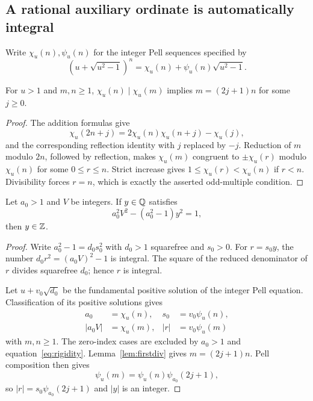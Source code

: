\subsection{A rational auxiliary ordinate is automatically integral}

Write $\chi_u(n),\psi_u(n)$ for the integer Pell sequences specified by
\[
(u+\sqrt{u^2-1})^n=\chi_u(n)+\psi_u(n)\sqrt{u^2-1}.
\]

\begin{lemma}
\label{lem:firstdiv}
For $u>1$ and $m,n\ge1$,
$\chi_u(n)\mid\chi_u(m)$ implies $m=(2j+1)n$ for some $j\ge0$.
\end{lemma}
\begin{proof}
The addition formulas give
\[
\chi_u(2n+j)=2\chi_u(n)\chi_u(n+j)-\chi_u(j),
\]
and the corresponding reflection identity with $j$ replaced by $-j$.
Reduction of $m$ modulo $2n$, followed by reflection, makes
$\chi_u(m)$ congruent to $\pm\chi_u(r)$ modulo $\chi_u(n)$ for some
$0\le r\le n$.  Strict increase gives
$1\le\chi_u(r)<\chi_u(n)$ if $r<n$.  Divisibility forces $r=n$,
which is exactly the asserted odd-multiple condition.
\end{proof}

\begin{lemma}
\label{lem:rigidity}
Let $a_0>1$ and $V$ be integers.  If $y\in\mathbb Q$ satisfies
\begin{equation}
a_0^2V^2-(a_0^2-1)y^2=1,
\label{eq:rigidity}
\end{equation}
then $y\in\mathbb Z$.
\end{lemma}
\begin{proof}
Write $a_0^2-1=d_0s_0^2$ with $d_0>1$ squarefree and $s_0>0$.
For $r=s_0y$, the number $d_0r^2=(a_0V)^2-1$ is integral.
The square of the reduced denominator of $r$ divides squarefree $d_0$;
hence $r$ is integral.

Let $u+v_0\sqrt{d_0}$ be the fundamental positive solution of the
integer Pell equation.  Classification of its positive solutions gives
\begin{align*}
a_0&=\chi_u(n),&s_0&=v_0\psi_u(n),\\
|a_0V|&=\chi_u(m),&|r|&=v_0\psi_u(m)
\end{align*}
with $m,n\ge1$.  The zero-index cases are excluded by $a_0>1$ and
equation~\eqref{eq:rigidity}.  Lemma~\ref{lem:firstdiv} gives
$m=(2j+1)n$.  Pell composition then gives
\[
\psi_u(m)=\psi_u(n)\psi_{a_0}(2j+1),
\]
so $|r|=s_0\psi_{a_0}(2j+1)$ and $|y|$ is an integer.
\end{proof}

